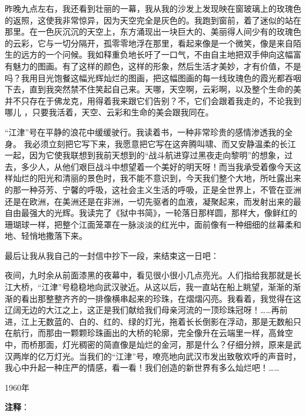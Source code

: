 \documentclass[12pt,UTF-8,openany]{ctexbook}
\begin{document}
\begin{large}
    昨晚九点左右，我还看到壮丽的一幕，我从我的沙发上发现映在窗玻璃上的玫瑰色的返照，这使我非常惊异，因为天空完全是灰色的。我跑到窗前，着了迷似的站在那里。在一色灰沉沉的天空上，东方涌现出一块巨大的、美丽得人间少有的玫瑰色的云彩，它与一切分隔开，孤零零地浮在那里，看起来像是一个微笑，像是来自陌生的远方的一个问候。我如释重负地长吁了一口气，不由自主地把双手伸向这幅富有魅力的图画。有了这样的颜色，这样的形象，然后生活才美妙，才有价值，不是吗？我用目光饱餐这幅光辉灿烂的图画，把这幅图画的每一线玫瑰色的霞光都吞咽下去，直到我突然禁不住笑起自己来。天哪，天空啊，云彩啊，以及整个生命的美并不只存在于佛龙克，用得着我来跟它们告别？不，它们会跟着我走的，不论我到哪儿 ，只要我活着，天空、云彩和生命的美会跟我同在。
    
    “江津”号在平静的浪花中缓缓驶行。我读着书，一种非常珍贵的感情渗透我的全身。 我必须立刻把它写下来，我愿意把它写在这奔腾叫啸、而又安静温柔的长江一起，因为它使我联想到我前天想到的“战斗航进穿过黑夜走向黎明”的想象，过去，多少人，从他们艰巨战斗中想望着一个美好的明天呀！而当我承受着像今天这样灿烂的阳光和清丽的景色时，我不能不意识到，今天我们整个大地，所吐露出来的那一种芬芳、宁馨的呼吸，这社会主义生活的呼吸，正是全世界上，不管在亚洲还是在欧洲，在美洲还是在非洲，一切先驱者的血液，凝聚起来，而发射出来的最自由最强大的光辉。我读完了《狱中书简》，一轮落日那样圆，那样大，像鲜红的珊瑚球一样，把整个江面笼罩在一脉淡淡的红光中，面前像有一种细细的丝幕柔和地、轻悄地撒落下来。
    
    最后让我从我自己的一封信中抄下一段，来结束这一日吧：
    
    夜间，九时余从前面漆黑的夜幕中，看见很小很小几点亮光。人们指给我那就是长江大桥，“江津”号稳稳地向武汉驶近。从这以后，我一直站在船上眺望，渐渐的渐渐的看出那整整齐齐的一排像横串起来的珍珠，在熠熠闪亮。我看着，我觉得在这辽阔无边的大江之上，这正是我们献给我们母亲河流的一顶珍珠冠呀！……再前进，江上无数蓝的、白的、红的、绿的灯光，拖着长长倒影在浮动，那是无数船只在航行，而那由一颗颗珍珠画出的大桥的轮廓，完全像升在云端里一样，高耸空中，而桥那面，灯光稠密的简直像是灿烂的金河，那是什么？仔细分辨，原来是武汉两岸的亿万灯光。当我们的“江津”号，嘹亮地向武汉市发出致敬欢呼的声音时，我心中升起一种庄严的情感，看一看！我们创造的新世界有多么灿烂吧！……
    
    \hfill 1960年
    
\end{large}


\newpage

\textbf{注释}：

\vspace{-1em}
\end{document}
